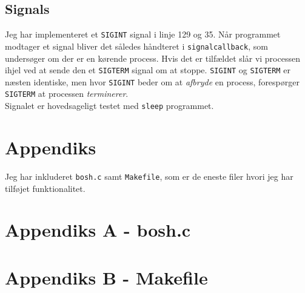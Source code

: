 \documentclass{article}
\begin{document}
\subsection*{Signals}
Jeg har implementeret et \texttt{SIGINT} signal i linje 129 og 35. Når programmet modtager et signal bliver det således håndteret i \texttt{signalcallback}, som undersøger om der er en kørende process. Hvis det er tilfældet slår vi processen ihjel ved at sende den et \texttt{SIGTERM} signal om at stoppe. \texttt{SIGINT} og \texttt{SIGTERM} er næsten identiske, men hvor \texttt{SIGINT} beder om at \textit{afbryde} en process, forespørger \texttt{SIGTERM} at processen \textit{terminerer}.\\
Signalet er hovedsageligt testet med \texttt{sleep} programmet.

\newpage

\section*{Appendiks}
Jeg har inkluderet \texttt{bosh.c} samt \texttt{Makefile}, som er de eneste filer hvori jeg har tilføjet funktionalitet.

\section*{Appendiks A - bosh.c}


\newpage

\section*{Appendiks B - Makefile}

\end{document}
